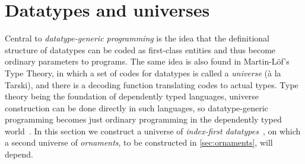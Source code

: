 

\section{Datatypes and universes}
\label{sec:universes}

Central to \emph{datatype-generic programming} is the idea that the definitional structure of datatypes can be coded as first-class entities and thus become ordinary parameters to programs.
The same idea is also found in Martin-Löf's Type Theory, in which a set of codes for datatypes is called a \emph{universe} (à la Tarski), and there is a decoding function translating codes to actual types.
Type theory being the foundation of dependently typed languages, universe construction can be done directly in such languages, so datatype-generic programming becomes just ordinary programming in the dependently typed world~\citep{Altenkirch-GP-within-DTP}.
In this section we construct a universe of \emph{index-first datatypes}~\citep{Chapman-levitation, Dagand-functional-ornaments}, on which a second universe of \emph{ornaments}, to be constructed in \autoref{sec:ornaments}, will depend.

